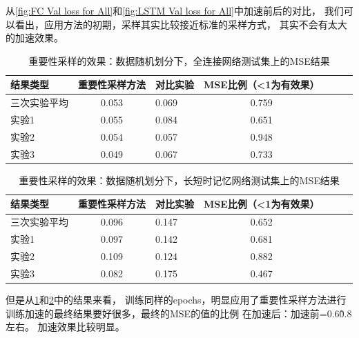   从\ref{fig:FC Val loss for All}和\ref{fig:LSTM Val loss for All}中加速前后的对比，
  我们可以看出，应用方法的初期，采样其实比较接近标准的采样方式，
  其实不会有太大的加速效果。

  \begin{table}
    \centering
    \caption{重要性采样的效果：数据随机划分下，全连接网络测试集上的MSE结果}
    \begin{tabular}{lclclcl}
      \toprule
      结果类型       & 重要性采样方法 & 对比实验 & MSE比例（<1为有效果）                                     \\
      \midrule
      三次实验平均   & 0.053 & 0.069 & 0.759 \\
      实验1    & 0.055 & 0.084 & 0.651                                \\
      实验2 & 0.054 & 0.057 & 0.948                                     \\
      实验3 & 0.049 & 0.067 & 0.733                  \\
      \bottomrule
    \end{tabular}
    \label{tab:fc random test mses}
  \end{table}

  \begin{table}
    \centering
    \caption{重要性采样的效果：数据随机划分下，长短时记忆网络测试集上的MSE结果}
    \begin{tabular}{lclclcl}
      \toprule
      结果类型       & 重要性采样方法 & 对比实验 & MSE比例（<1为有效果）                                       \\
      \midrule
      三次实验平均   & 0.096 &  0.147 & 0.652 \\
      实验1    & 0.097 &  0.142 & 0.681 \\
      实验2 & 0.109 & 0.124 & 0.882                                     \\
      实验3 & 0.082 & 0.175 & 0.467                  \\
      \bottomrule
    \end{tabular}
    \label{tab:lstm random test mses}
  \end{table}

  但是从\ref{tab:fc random test mses}和\ref{tab:lstm random test mses}中的结果来看，
  训练同样的epochs，明显应用了重要性采样方法进行训练加速的最终结果要好很多，最终的MSE的值的比例
  在加速后：加速前=0.6\~0.8左右。
  加速效果比较明显。

